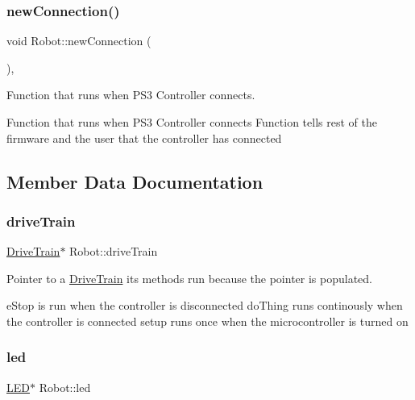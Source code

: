 \subsubsection{\texorpdfstring{new\+Connection()}{newConnection()}}
{\footnotesize\ttfamily void Robot\+::new\+Connection (\begin{DoxyParamCaption}{ }\end{DoxyParamCaption})\hspace{0.3cm}{\ttfamily [inline]}, {\ttfamily [protected]}}



Function that runs when P\+S3 Controller connects. 

Function that runs when P\+S3 Controller connects Function tells rest of the firmware and the user that the controller has connected 

\subsection{Member Data Documentation}
\mbox{\label{class_robot_a4b499841182a38720a26a493fa98363a}} 
\subsubsection{\texorpdfstring{drive\+Train}{driveTrain}}
{\footnotesize\ttfamily \mbox{\hyperlink{class_drive_train}{Drive\+Train}}$\ast$ Robot\+::drive\+Train\hspace{0.3cm}{\ttfamily [protected]}}



Pointer to a \mbox{\hyperlink{class_drive_train}{Drive\+Train}} its methods run because the pointer is populated. 

e\+Stop is run when the controller is disconnected do\+Thing runs continously when the controller is connected setup runs once when the microcontroller is turned on \mbox{\label{class_robot_a28c6c49c9a12c8767e118e0e8a4165cf}} 
\subsubsection{\texorpdfstring{led}{led}}
{\footnotesize\ttfamily \mbox{\hyperlink{class_l_e_d}{L\+ED}}$\ast$ Robot\+::led\hspace{0.3cm}{\ttfamily [protected]}}



